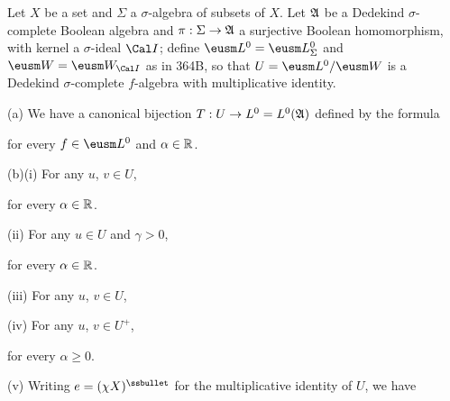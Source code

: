 Let $X$ be a set and $\Sigma$ a
$\sigma$-algebra of subsets of $X$.   Let $\frak A$ be a Dedekind
$\sigma$-complete Boolean algebra and $\pi:\Sigma\to\frak A$ a
surjective Boolean homomorphism, with kernel a $\sigma$-ideal $\Cal I$;
define $\eusm L^0=\eusm L^0_{\Sigma}$ and $\eusm W=\eusm W_{\Cal I}$
as in 364B, so that
$U=\eusm L^0/\eusm W$ is a Dedekind $\sigma$-complete $f$-algebra with multiplicative
identity.

(a) We have a canonical bijection  $T:U\to L^0=L^0(\frak A)$ defined by
the formula


\noindent for every $f\in\eusm L^0$ and $\alpha\in\Bbb R$.

(b)(i) For any $u$, $v\in U$,


\noindent for every $\alpha\in\Bbb R$.

\quad(ii) For any $u\in U$ and $\gamma>0$,


\noindent for every $\alpha\in\Bbb R$.

\quad(iii) For any $u$, $v\in U$,


\quad(iv) For any $u$, $v\in U^+$,


\noindent for every $\alpha\ge 0$.

\quad(v) Writing $e=(\chi X)^{\ssbullet}$ for the multiplicative
identity of $U$, we have


